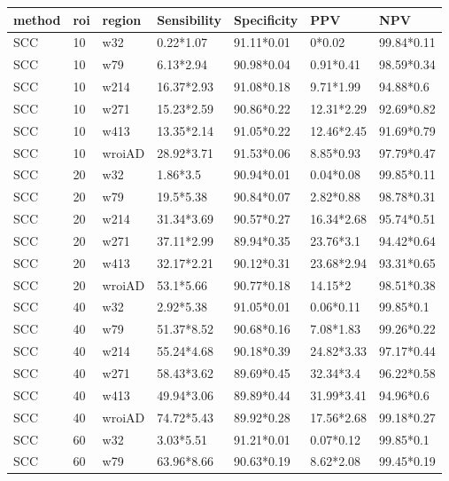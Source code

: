 


\begin{table}[ht]
\centering
\begin{tabular}{lllllll}
  \hline
method & roi & region & Sensibility & Specificity & PPV & NPV \\ 
  \hline
SCC & 10 & w32 & 0.22*1.07 & 91.11*0.01 & 0*0.02 & 99.84*0.11 \\ 
  SCC & 10 & w79 & 6.13*2.94 & 90.98*0.04 & 0.91*0.41 & 98.59*0.34 \\ 
  SCC & 10 & w214 & 16.37*2.93 & 91.08*0.18 & 9.71*1.99 & 94.88*0.6 \\ 
  SCC & 10 & w271 & 15.23*2.59 & 90.86*0.22 & 12.31*2.29 & 92.69*0.82 \\ 
  SCC & 10 & w413 & 13.35*2.14 & 91.05*0.22 & 12.46*2.45 & 91.69*0.79 \\ 
  SCC & 10 & wroiAD & 28.92*3.71 & 91.53*0.06 & 8.85*0.93 & 97.79*0.47 \\ 
  SCC & 20 & w32 & 1.86*3.5 & 90.94*0.01 & 0.04*0.08 & 99.85*0.11 \\ 
  SCC & 20 & w79 & 19.5*5.38 & 90.84*0.07 & 2.82*0.88 & 98.78*0.31 \\ 
  SCC & 20 & w214 & 31.34*3.69 & 90.57*0.27 & 16.34*2.68 & 95.74*0.51 \\ 
  SCC & 20 & w271 & 37.11*2.99 & 89.94*0.35 & 23.76*3.1 & 94.42*0.64 \\ 
  SCC & 20 & w413 & 32.17*2.21 & 90.12*0.31 & 23.68*2.94 & 93.31*0.65 \\ 
  SCC & 20 & wroiAD & 53.1*5.66 & 90.77*0.18 & 14.15*2 & 98.51*0.38 \\ 
  SCC & 40 & w32 & 2.92*5.38 & 91.05*0.01 & 0.06*0.11 & 99.85*0.1 \\ 
  SCC & 40 & w79 & 51.37*8.52 & 90.68*0.16 & 7.08*1.83 & 99.26*0.22 \\ 
  SCC & 40 & w214 & 55.24*4.68 & 90.18*0.39 & 24.82*3.33 & 97.17*0.44 \\ 
  SCC & 40 & w271 & 58.43*3.62 & 89.69*0.45 & 32.34*3.4 & 96.22*0.58 \\ 
  SCC & 40 & w413 & 49.94*3.06 & 89.89*0.44 & 31.99*3.41 & 94.96*0.6 \\ 
  SCC & 40 & wroiAD & 74.72*5.43 & 89.92*0.28 & 17.56*2.68 & 99.18*0.27 \\ 
  SCC & 60 & w32 & 3.03*5.51 & 91.21*0.01 & 0.07*0.12 & 99.85*0.1 \\ 
  SCC & 60 & w79 & 63.96*8.66 & 90.63*0.19 & 8.62*2.08 & 99.45*0.19 \\ 

\end{tabular}
\end{table}
